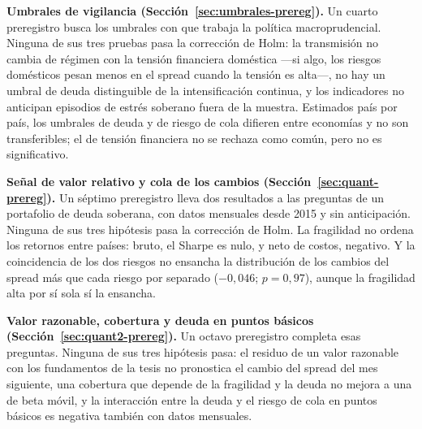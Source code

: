 \textbf{Umbrales de vigilancia (Sección~\ref{sec:umbrales-prereg}).} Un cuarto preregistro busca los umbrales con que trabaja la política macroprudencial. Ninguna de sus tres pruebas pasa la corrección de Holm: la transmisión no cambia de régimen con la tensión financiera doméstica ---si algo, los riesgos domésticos pesan menos en el spread cuando la tensión es alta---, no hay un umbral de deuda distinguible de la intensificación continua, y los indicadores no anticipan episodios de estrés soberano fuera de la muestra. Estimados país por país, los umbrales de deuda y de riesgo de cola difieren entre economías y no son transferibles; el de tensión financiera no se rechaza como común, pero no es significativo.

\textbf{Señal de valor relativo y cola de los cambios (Sección~\ref{sec:quant-prereg}).} Un séptimo preregistro lleva dos resultados a las preguntas de un portafolio de deuda soberana, con datos mensuales desde 2015 y sin anticipación. Ninguna de sus tres hipótesis pasa la corrección de Holm. La fragilidad no ordena los retornos entre países: bruto, el Sharpe es nulo, y neto de costos, negativo. Y la coincidencia de los dos riesgos no ensancha la distribución de los cambios del spread más que cada riesgo por separado ($-0{,}046$; $p=0{,}97$), aunque la fragilidad alta por sí sola sí la ensancha.

\textbf{Valor razonable, cobertura y deuda en puntos básicos (Sección~\ref{sec:quant2-prereg}).} Un octavo preregistro completa esas preguntas. Ninguna de sus tres hipótesis pasa: el residuo de un valor razonable con los fundamentos de la tesis no pronostica el cambio del spread del mes siguiente, una cobertura que depende de la fragilidad y la deuda no mejora a una de beta móvil, y la interacción entre la deuda y el riesgo de cola en puntos básicos es negativa también con datos mensuales.

